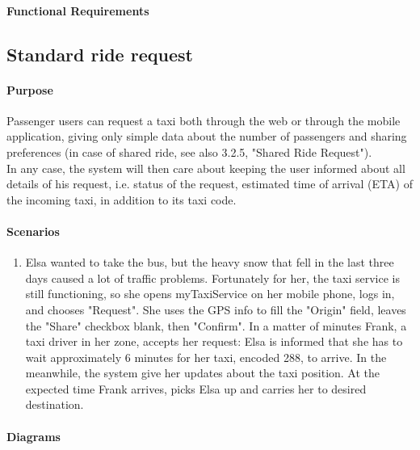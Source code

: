 \paragraph{Functional Requirements}

\subsection{Standard ride request}

\paragraph{Purpose}

Passenger users can request a taxi both through the web or through the mobile application, giving only simple data about the number of passengers and sharing preferences (in case of shared ride, see also 3.2.5, "Shared Ride Request").\\
In any case, the system will then care about keeping the user informed about all details of his request, i.e. status of the request, estimated time of arrival (ETA) of the incoming taxi, in addition to its taxi code.

\paragraph{Scenarios}
\begin{enumerate}
	\item Elsa wanted to take the bus, but the heavy snow that fell in the last three days caused a lot of traffic problems. Fortunately for her, the taxi service is still functioning, so she opens myTaxiService on her mobile phone, logs in, and chooses "Request".
	She uses the GPS info to fill the "Origin" field, leaves the "Share" checkbox blank, then "Confirm". In a matter of minutes Frank, a taxi driver in her zone, accepts her request: Elsa is informed that she has to wait approximately 6 minutes for her taxi, encoded 288, to arrive. In the meanwhile, the system give her updates about the taxi position. At the expected time Frank arrives, picks Elsa up and carries her to desired destination.
\end{enumerate}

\paragraph{Diagrams}


